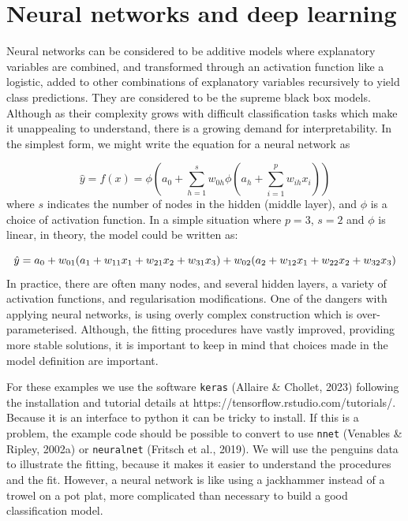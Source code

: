 \documentclass[
  letterpaper,
]{krantz}
\begin{document}
\hypertarget{neural-networks-and-deep-learning}{%
\chapter{Neural networks and deep
learning}\label{neural-networks-and-deep-learning}}


Neural networks can be considered to be additive models where
explanatory variables are combined, and transformed through an
activation function like a logistic, added to other combinations of
explanatory variables recursively to yield class predictions. They are
considered to be the supreme black box models. Although as their
complexity grows with difficult classification tasks which make it
unappealing to understand, there is a growing demand for
interpretability. In the simplest form, we might write the equation for
a neural network as

\[
\hat{y} = f(x) = \phi(a_0+\sum_{h=1}^{s}
w_{0h}\phi(a_h+\sum_{i=1}^{p} w_{ih}x_i))
\] where \(s\) indicates the number of nodes in the hidden (middle
layer), and \(\phi\) is a choice of activation function. In a simple
situation where \(p=3\), \(s=2\) and \(\phi\) is linear, in theory, the
model could be written as:

\[
\hat{y} = a_0+w_{01}(a_1+w_{11}x_1+w_{21}x_2+w_{31}x_3) +\\
w_{02}(a_2+w_{12}x_1+w_{22}x_2+w_{32}x_3)
\] In practice, there are often many nodes, and several hidden layers, a
variety of activation functions, and regularisation modifications. One
of the dangers with applying neural networks, is using overly complex
construction which is over-parameterised. Although, the fitting
procedures have vastly improved, providing more stable solutions, it is
important to keep in mind that choices made in the model definition are
important.

For these examples we use the software \texttt{keras} (Allaire \&
Chollet, 2023) following the installation and tutorial details at
https://tensorflow.rstudio.com/tutorials/. Because it is an interface to
python it can be tricky to install. If this is a problem, the example
code should be possible to convert to use \texttt{nnet} (Venables \&
Ripley, 2002a) or \texttt{neuralnet} (Fritsch et al., 2019). We will use
the penguins data to illustrate the fitting, because it makes it easier
to understand the procedures and the fit. However, a neural network is
like using a jackhammer instead of a trowel on a pot plat, more
complicated than necessary to build a good classification model.
\end{document}
